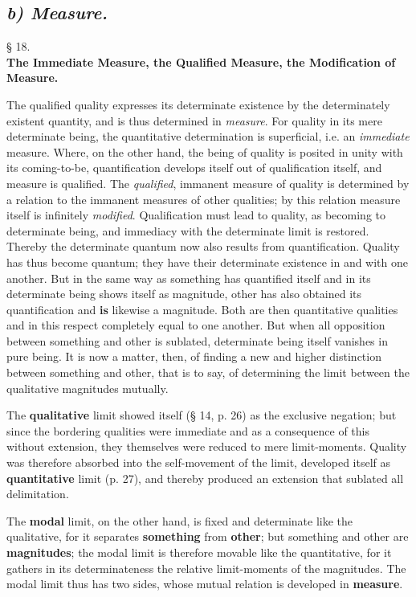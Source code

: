\documentclass[12pt,a4paper,openany]{book}
\newcommand{\opage}[1]{\marginnote{\footnotesize\textit{[#1]}}}
\newcommand{\underafsnit}[1]{\subsection*{\centering\emph{#1}}\addcontentsline{toc}{subsection}{#1}}
\newcommand{\paragraf}[2]{\begin{center}§ #1.\\[0.2em]\textbf{#2}\end{center}}
\begin{document}
\underafsnit{b) Measure.}
\paragraf{18}{The Immediate Measure, the Qualified Measure, the Modification of Measure.}

The qualified quality expresses its determinate existence by the determinately existent quantity, and is
\setcounter{footnote}{0}%
\opage{59}thus determined in \emph{measure}. For quality in its mere determinate being, the quantitative determination is superficial, i.e. an \emph{immediate} measure. Where, on the other hand, the being of quality is posited in unity with its coming-to-be, quantification develops itself out of qualification itself, and measure is qualified. The \emph{qualified}, immanent measure of quality is determined by a relation to the immanent measures of other qualities; by this relation measure itself is infinitely \emph{modified}. Qualification must lead to quality, as becoming to determinate being, and immediacy with the determinate limit is restored. Thereby the determinate quantum now also results from quantification. Quality has thus become quantum; they have their determinate existence in and with one another. But in the same way as something has quantified itself and in its determinate being shows itself as magnitude, other has also obtained its quantification and \textbf{is} likewise a magnitude. Both are then quantitative qualities and in this respect completely equal to one another. But when all opposition between something and other is sublated, determinate being itself vanishes in pure being. It is now a matter, then, of finding a new and higher distinction between something and other, that is to say, of determining the limit between the qualitative magnitudes mutually.

The \textbf{qualitative} limit showed itself (§ 14, p. 26) as the exclusive negation; but since the bordering qualities were immediate and as a consequence of this without extension, they themselves were reduced to mere limit-moments. Quality was therefore absorbed into the self-movement of the limit, developed itself as \textbf{quantitative} limit
\setcounter{footnote}{0}%
\opage{60}(p. 27), and thereby produced an extension that sublated all delimitation.

The \textbf{modal} limit, on the other hand, is fixed and determinate like the qualitative, for it separates \textbf{something} from \textbf{other}; but something and other are \textbf{magnitudes}; the modal limit is therefore movable like the quantitative, for it gathers in its determinateness the relative limit-moments of the magnitudes. The modal limit thus has two sides, whose mutual relation is developed in \textbf{measure}.
\end{document}
